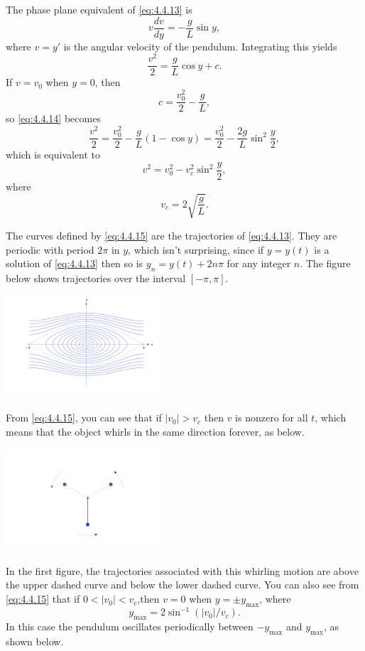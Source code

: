 \documentclass{ximera}
\begin{document}
\begin{example}
 
The phase plane equivalent of \eqref{eq:4.4.13} is
$$
v\frac{dv}{dy}=-\frac{g}{L}\sin y,
$$
where $v=y'$ is the angular velocity of the pendulum. Integrating this
yields
\begin{equation} \label{eq:4.4.14}
\frac{v^2}{2}=\frac{g}{L}\cos y+c.
\end{equation}
If $v=v_0$ when $y=0$, then
$$
c=\frac{v_0^2}{2}-\frac{g}{L},
$$
so \eqref{eq:4.4.14} becomes
$$
\frac{v^2}{2}=\frac{v_0^2}{2}-\frac{g}{L}(1-\cos y)
=\frac{v_0^2}{2}-\frac{2g}{L}\sin^2\frac{y}{2},
$$
which is equivalent to
\begin{equation} \label{eq:4.4.15}
v^2=v_0^2-v_c^2\sin^2\frac{y}{2},
\end{equation}
 where
$$
v_c=2\sqrt{\frac{g}{L}}.
$$
 
The curves defined by \eqref{eq:4.4.15} are the trajectories of
\eqref{eq:4.4.13}. They are periodic with period $2\pi$ in $y$, which isn't
 surprising, since if $y=y(t)$ is a solution of \eqref{eq:4.4.13} then
so is $y_n=y(t)+2n\pi$ for any integer $n$. The figure below
shows trajectories over the interval $[-\pi,\pi]$.
 
\begin{image}
 \includegraphics[height=1.5in]{fig040407.jpg}
\end{image}
 
 
From \eqref{eq:4.4.15},
you can see that if $|v_0|>v_c$ then $v$ is nonzero for all $t$, which
means that the object whirls in the same direction forever, as below.
 
\begin{image}
 \includegraphics[height=1.5in]{fig040408.jpg}
\end{image}
 
 
In the first figure, the trajectories associated with this
whirling motion are above the upper dashed curve and below the lower
dashed curve. You can also see from
\eqref{eq:4.4.15} that if $0<|v_0|<v_c$,then $v=0$ when $y=\pm y_{\max}$,
where
$$
y_{\max}=2\sin^{-1}(|v_0|/v_c).
$$
In this case the pendulum oscillates periodically between $-y_{\max}$
and $y_{\max}$, as shown below.
 

\end{example}
\end{document}
